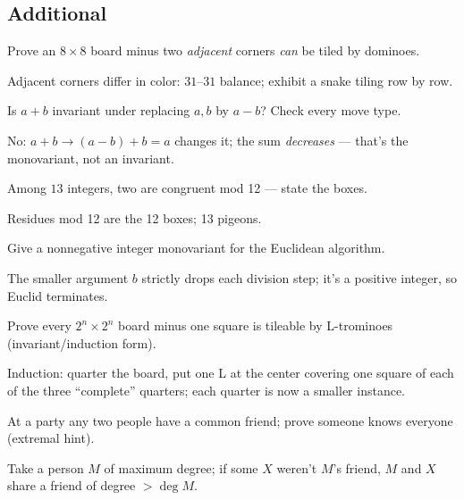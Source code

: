 \subsection*{Additional}
\begin{exercise}[easy]\label{exr:ia1}
Prove an $8\times8$ board minus two \emph{adjacent} corners \emph{can}
be tiled by dominoes.
\end{exercise}
\begin{solution}
Adjacent corners differ in color: $31$--$31$ balance; exhibit a snake
tiling row by row.
\end{solution}
\begin{exercise}[easy]\label{exr:ia2}
Is $a+b$ invariant under replacing $a,b$ by $a-b$? Check every move
type.
\end{exercise}
\begin{solution}
No: $a+b \to (a-b)+b = a$ changes it; the sum \emph{decreases} ---
that's the monovariant, not an invariant.
\end{solution}
\begin{exercise}[easy]\label{exr:ia3}
Among $13$ integers, two are congruent mod 12 --- state the boxes.
\end{exercise}
\begin{solution}
Residues mod 12 are the 12 boxes; 13 pigeons.
\end{solution}
\begin{exercise}[easy]\label{exr:ia4}
Give a nonnegative integer monovariant for the Euclidean algorithm.
\end{exercise}
\begin{solution}
The smaller argument $b$ strictly drops each division step; it's a
positive integer, so Euclid terminates.
\end{solution}
\begin{exercise}[medium]\label{exr:ia5}
Prove every $2^n\times2^n$ board minus one square is tileable by
L-trominoes (invariant/induction form).
\end{exercise}
\begin{solution}
Induction: quarter the board, put one L at the center covering one
square of each of the three ``complete'' quarters; each quarter is now
a smaller instance.
\end{solution}
\begin{exercise}[medium]\label{exr:ia6}
At a party any two people have a common friend; prove someone knows
everyone (extremal hint).
\end{exercise}
\begin{solution}
Take a person $M$ of maximum degree; if some $X$ weren't $M$'s friend,
$M$ and $X$ share a friend of degree $> \deg M$.
\end{solution}
